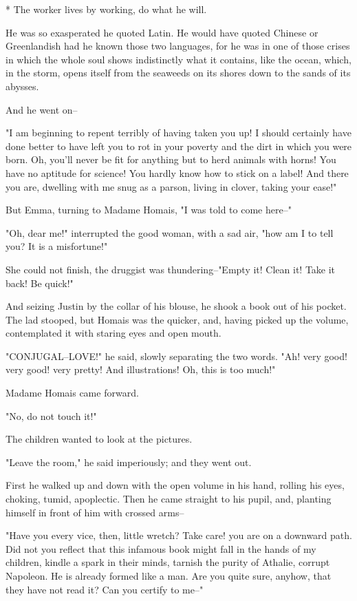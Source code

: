 \documentclass{tufte-book}
\begin{document}
     * The worker lives by working, do what he will.


He was so exasperated he quoted Latin. He would have quoted Chinese
or Greenlandish had he known those two languages, for he was in one
of those crises in which the whole soul shows indistinctly what it
contains, like the ocean, which, in the storm, opens itself from the
seaweeds on its shores down to the sands of its abysses.

And he went on--

"I am beginning to repent terribly of having taken you up! I should
certainly have done better to have left you to rot in your poverty and
the dirt in which you were born. Oh, you'll never be fit for anything
but to herd animals with horns! You have no aptitude for science! You
hardly know how to stick on a label! And there you are, dwelling with me
snug as a parson, living in clover, taking your ease!"

But Emma, turning to Madame Homais, "I was told to come here--"

"Oh, dear me!" interrupted the good woman, with a sad air, "how am I to
tell you? It is a misfortune!"

She could not finish, the druggist was thundering--"Empty it! Clean it!
Take it back! Be quick!"

And seizing Justin by the collar of his blouse, he shook a book out of
his pocket. The lad stooped, but Homais was the quicker, and, having
picked up the volume, contemplated it with staring eyes and open mouth.

"CONJUGAL--LOVE!" he said, slowly separating the two words. "Ah! very
good! very good! very pretty! And illustrations! Oh, this is too much!"

Madame Homais came forward.

"No, do not touch it!"

The children wanted to look at the pictures.

"Leave the room," he said imperiously; and they went out.

First he walked up and down with the open volume in his hand, rolling
his eyes, choking, tumid, apoplectic. Then he came straight to his
pupil, and, planting himself in front of him with crossed arms--

"Have you every vice, then, little wretch? Take care! you are on a
downward path. Did not you reflect that this infamous book might fall
in the hands of my children, kindle a spark in their minds, tarnish the
purity of Athalie, corrupt Napoleon. He is already formed like a man.
Are you quite sure, anyhow, that they have not read it? Can you certify
to me--"
\end{document}
